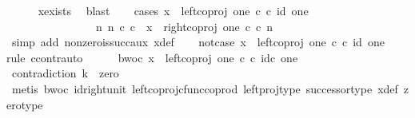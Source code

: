 \begin{isabellebody}
\ \ \ \ \isamarkupfalse%
\ x{\isacharunderscore}{\kern0pt}exists\ \isamarkupfalse%
\ blast\isanewline
\ \ \isamarkupfalse%
\ cases{\isacharcolon}{\kern0pt}\ {\isachardoublequoteopen}{\isacharparenleft}{\kern0pt}x\ {\isacharequal}{\kern0pt}\ {\isacharparenleft}{\kern0pt}left{\isacharunderscore}{\kern0pt}coproj\ one\ {\isasymnat}\isactrlsub c{\isacharparenright}{\kern0pt}\ {\isasymcirc}\isactrlsub c\ id\ one{\isacharparenright}{\kern0pt}\ {\isasymor}\ \isanewline
\ \ \ \ \ \ \ \ \ \ \ \ \ \ \ \ {\isacharparenleft}{\kern0pt}{\isasymexists}n{\isachardot}{\kern0pt}\ {\isacharparenleft}{\kern0pt}n\ {\isasymin}\isactrlsub c\ {\isasymnat}\isactrlsub c\ {\isasymand}\ x\ {\isacharequal}{\kern0pt}\ {\isacharparenleft}{\kern0pt}right{\isacharunderscore}{\kern0pt}coproj\ one\ {\isasymnat}\isactrlsub c{\isacharparenright}{\kern0pt}\ {\isasymcirc}\isactrlsub c\ n{\isacharparenright}{\kern0pt}{\isacharparenright}{\kern0pt}{\isachardoublequoteclose}\isanewline
\ \ \ \ \isamarkupfalse%
\ {\isacharparenleft}{\kern0pt}simp\ add{\isacharcolon}{\kern0pt}\ nonzero{\isacharunderscore}{\kern0pt}is{\isacharunderscore}{\kern0pt}succ{\isacharunderscore}{\kern0pt}aux\ x{\isacharunderscore}{\kern0pt}def{\isacharparenright}{\kern0pt}\isanewline
\ \ \isamarkupfalse%
\ not{\isacharunderscore}{\kern0pt}case{\isacharunderscore}{\kern0pt}{}{\isacharcolon}{\kern0pt}\ {\isachardoublequoteopen}x\ {\isasymnoteq}\ {\isacharparenleft}{\kern0pt}left{\isacharunderscore}{\kern0pt}coproj\ one\ {\isasymnat}\isactrlsub c{\isacharparenright}{\kern0pt}\ {\isasymcirc}\isactrlsub c\ id\ one{\isachardoublequoteclose}\isanewline
\ \ \isamarkupfalse%
{\isacharparenleft}{\kern0pt}rule\ ccontr{\isacharcomma}{\kern0pt}auto{\isacharparenright}{\kern0pt}\isanewline
\ \ \ \ \isamarkupfalse%
\ bwoc{\isacharcolon}{\kern0pt}\ {\isachardoublequoteopen}x\ {\isacharequal}{\kern0pt}\ left{\isacharunderscore}{\kern0pt}coproj\ one\ {\isasymnat}\isactrlsub c\ {\isasymcirc}\isactrlsub c\ id\isactrlsub c\ one{\isachardoublequoteclose}\isanewline
\ \ \ \ \isamarkupfalse%
\ contradiction{\isacharcolon}{\kern0pt}\ {\isachardoublequoteopen}k\ {\isacharequal}{\kern0pt}\ zero{\isachardoublequoteclose}\isanewline
\ \ \ \ \ \ \isamarkupfalse%
\ {\isacharparenleft}{\kern0pt}metis\ bwoc\ id{\isacharunderscore}{\kern0pt}right{\isacharunderscore}{\kern0pt}unit{}\ left{\isacharunderscore}{\kern0pt}coproj{\isacharunderscore}{\kern0pt}cfunc{\isacharunderscore}{\kern0pt}coprod\ left{\isacharunderscore}{\kern0pt}proj{\isacharunderscore}{\kern0pt}type\ successor{\isacharunderscore}{\kern0pt}type\ x{\isacharunderscore}{\kern0pt}def\ zero{\isacharunderscore}{\kern0pt}type{\isacharparenright}{\kern0pt}\isanewline

\end{isabellebody}
